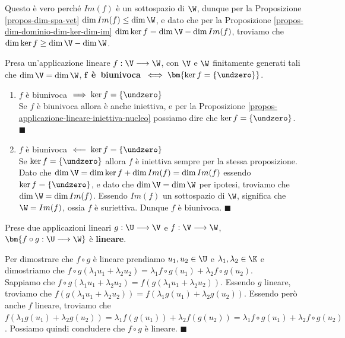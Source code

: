\documentclass[11pt, a4paper, titlepage, oneside]{scrbook}
\begin{document}
Questo è vero perché $Im(f)$ è un sottospazio di $\W$, dunque per la Proposizione \ref{propos-dim-spa-vet} $\dim Im(f) \leq \dim \W$, e dato che per la Proposizione \ref{propos-dim-dominio-dim-ker-dim-im} $\dim \ker f = \dim \V - \dim Im(f)$, troviamo che $\dim \ker f \geq \dim \V - \dim \W$.

\begin{Proposizione}[]
\label{propos-app-biunivoca-nucleo-nullo}
Presa un'applicazione lineare $f: \V \longrightarrow \W$, con $\V$ e $\W$ finitamente generati tali che $\dim \V = \dim \W$, \mbox{$\bm{f}$ \textbf{è biunivoca} $\iff \bm{\ker f = \{\undzero\}}$}.
\end{Proposizione}

\Dimostrazione \nopagebreak

\begin{enumerate}[label=\arabic*°]
    \item $f$ è biunivoca $\implies \ker f = \{\undzero\}$ \\
    Se $f$ è biunivoca allora è anche iniettiva, e per la Proposizione \ref{propos-applicazione-lineare-iniettiva-nucleo} possiamo dire che $\ker f = \{\undzero\}$. $\blacksquare$
    \item $f$ è biunivoca $\impliedby \ker f = \{\undzero\}$ \\
    Se $\ker f = \{\undzero\}$ allora $f$ è iniettiva sempre per la stessa proposizione. Dato che \mbox{$\dim \V = \dim \ker f + \dim Im(f) = \dim Im(f)$} essendo $\ker f = \{\undzero\}$, e dato che $\dim \V = \dim \W$ per ipotesi, troviamo che $\dim \W = \dim Im(f)$. Essendo $Im(f)$ un sottospazio di $\W$, significa che $\W = Im(f)$, ossia $f$ è suriettiva. Dunque $f$ è biunivoca. $\blacksquare$
\end{enumerate}

\begin{Proposizione}
\label{propos-comb-app-lin}
Prese due applicazioni lineari $g: \U \longrightarrow \V$ e $f: \V \longrightarrow \W$, $\bm{f \circ g: \U \longrightarrow \W}$ è \textbf{lineare}.
\end{Proposizione}

\Dimostrazione \nopagebreak

Per dimostrare che $f \circ g$ è lineare prendiamo $u_1, u_2 \in \U$ e $\lambda_1, \lambda_2 \in \K$ e dimostriamo che \mbox{$f \circ g (\lambda_1 u_1 + \lambda_2 u_2) = \lambda_1 f \circ g (u_1) + \lambda_2 f \circ g(u_2)$}. \\
Sappiamo che $f \circ g (\lambda_1 u_1 + \lambda_2 u_2) = f(g(\lambda_1 u_1 + \lambda_2 u_2))$. Essendo $g$ lineare, troviamo che \mbox{$f(g(\lambda_1 u_1 + \lambda_2 u_2)) = f(\lambda_1 g(u_1) + \lambda_2 g(u_2))$}. Essendo però anche $f$ lineare, troviamo che \mbox{$f(\lambda_1 g(u_1) + \lambda_2 g(u_2)) = \lambda_1 f(g(u_1)) + \lambda_2 f(g(u_2)) = \lambda_1 f \circ g (u_1) + \lambda_2 f \circ g (u_2)$}. Possiamo quindi concludere che $f \circ g$ è lineare. $\blacksquare$
\end{document}

